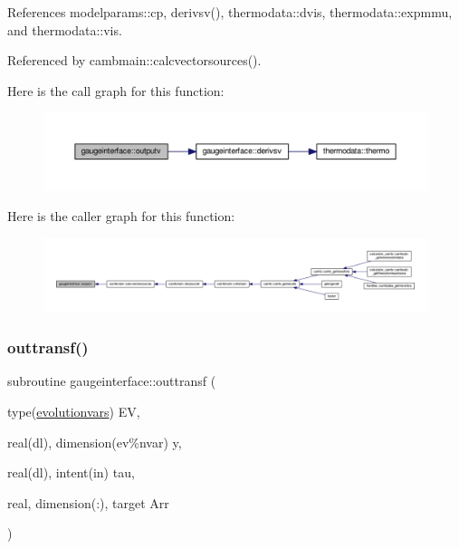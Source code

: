 References modelparams\+::cp, derivsv(), thermodata\+::dvis, thermodata\+::expmmu, and thermodata\+::vis.



Referenced by cambmain\+::calcvectorsources().

Here is the call graph for this function\+:
\nopagebreak
\begin{figure}[H]
\begin{center}
\leavevmode
\includegraphics[width=350pt]{namespacegaugeinterface_ad9126befa5df67da981345f6230fede4_cgraph}
\end{center}
\end{figure}
Here is the caller graph for this function\+:
\nopagebreak
\begin{figure}[H]
\begin{center}
\leavevmode
\includegraphics[width=350pt]{namespacegaugeinterface_ad9126befa5df67da981345f6230fede4_icgraph}
\end{center}
\end{figure}
\mbox{\label{namespacegaugeinterface_ae920635485c908177072c6cad0d49f59}} 
\subsubsection{\texorpdfstring{outtransf()}{outtransf()}}
{\footnotesize\ttfamily subroutine gaugeinterface\+::outtransf (\begin{DoxyParamCaption}\item[{type(\mbox{\hyperlink{structgaugeinterface_1_1evolutionvars}{evolutionvars}})}]{EV,  }\item[{real(dl), dimension(ev\%nvar)}]{y,  }\item[{real(dl), intent(in)}]{tau,  }\item[{real, dimension(\+:), target}]{Arr }\end{DoxyParamCaption})}




